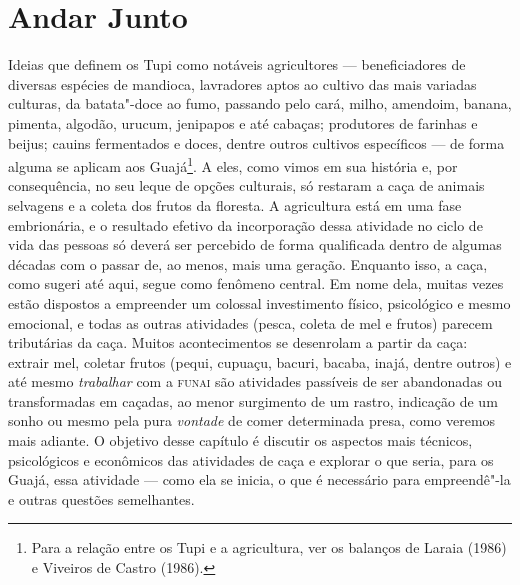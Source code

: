 
\chapter{Andar Junto}


Ideias que definem os Tupi como notáveis agricultores --- beneficiadores
de diversas espécies de mandioca, lavradores aptos ao cultivo das mais
variadas culturas, da batata"-doce ao fumo, passando pelo cará, milho,
amendoim, banana, pimenta, algodão, urucum, jenipapos e até cabaças;
produtores de farinhas e beijus; cauins fermentados e doces, dentre
outros cultivos específicos --- de forma alguma se aplicam aos
Guajá\footnote{Para a relação entre os Tupi e a agricultura, ver os
  balanços de Laraia (1986) e Viveiros de Castro (1986).}. A eles, como
vimos em sua história e, por consequência, no seu leque de opções
culturais, só restaram a caça de animais selvagens e a coleta dos frutos
da floresta. A agricultura está em uma fase embrionária, e o resultado
efetivo da incorporação dessa atividade no ciclo de vida das pessoas só
deverá ser percebido de forma qualificada dentro de algumas décadas com
o passar de, ao menos, mais uma geração. Enquanto isso, a caça, como
sugeri até aqui, segue como fenômeno central. Em nome dela, muitas vezes
estão dispostos a empreender um colossal investimento físico,
psicológico e mesmo emocional, e todas as outras atividades (pesca,
coleta de mel e frutos) parecem tributárias da caça. Muitos
acontecimentos se desenrolam a partir da caça: extrair mel, coletar
frutos (pequi, cupuaçu, bacuri, bacaba, inajá, dentre outros) e até
mesmo \emph{trabalhar} com a \textsc{funai} são atividades passíveis de ser
abandonadas ou transformadas em caçadas, ao menor surgimento de um
rastro, indicação de um sonho ou mesmo pela pura \emph{vontade} de comer
determinada presa, como veremos mais adiante. O objetivo desse capítulo
é discutir os aspectos mais técnicos, psicológicos e econômicos das
atividades de caça e explorar o que seria, para os Guajá, essa atividade
--- como ela se inicia, o que é necessário para empreendê"-la e outras
questões semelhantes.

